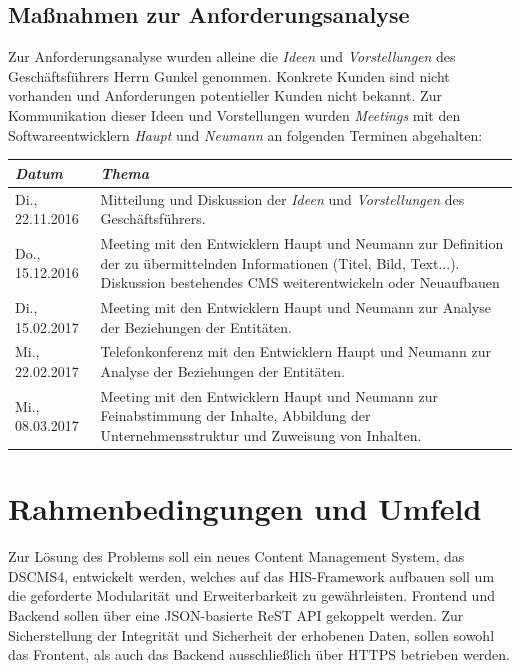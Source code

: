 \documentclass[a4paper]{article}
\begin{document}
	\subsection{Maßnahmen zur Anforderungsanalyse}
	Zur Anforderungsanalyse wurden alleine die \emph{Ideen} und \emph{Vorstellungen} des Geschäftsführers Herrn Gunkel genommen.
	Konkrete Kunden sind nicht vorhanden und Anforderungen potentieller Kunden nicht bekannt.
	Zur Kommunikation dieser Ideen und Vorstellungen wurden \emph{Meetings} mit den Softwareentwicklern \emph{Haupt} und \emph{Neumann} an folgenden Terminen abgehalten:
	\begin{center}
		\begin{tabular}{|p{}|p{}|}
			\hline
			\emph{Datum} & \emph{Thema} \\
			\hline
			Di., 22.11.2016 & Mitteilung und Diskussion der \emph{Ideen} und \emph{Vorstellungen} des Geschäftsführers. \\
			\hline
			Do., 15.12.2016 &Meeting mit den Entwicklern Haupt und Neumann zur Definition der zu übermittelnden Informationen (Titel, Bild, Text...).
       		Diskussion bestehendes CMS weiterentwickeln oder Neuaufbauen
			\\
			\hline
			Di., 15.02.2017 & Meeting mit den Entwicklern Haupt und Neumann zur Analyse der Beziehungen der Entitäten. \\
			\hline
			Mi., 22.02.2017 & Telefonkonferenz mit den Entwicklern Haupt und Neumann zur Analyse der Beziehungen der Entitäten. \\
			\hline
			Mi., 08.03.2017 & Meeting mit den Entwicklern Haupt und Neumann zur Feinabstimmung der Inhalte, Abbildung der Unternehmensstruktur und Zuweisung von Inhalten. \\
			\hline	
		\end{tabular}
	\end{center}
	
	\pagebreak
	\section{Rahmenbedingungen und Umfeld}
	Zur Lösung des Problems soll ein neues Content Management System, das DSCMS4, entwickelt werden, welches auf das HIS-Framework aufbauen soll um die geforderte Modularität und Erweiterbarkeit zu gewährleisten.
	Frontend und Backend sollen über eine JSON-basierte ReST API gekoppelt werden.
	Zur Sicherstellung der Integrität und Sicherheit der erhobenen Daten, sollen sowohl das Frontent, als auch das Backend ausschließlich über HTTPS betrieben werden.
\end{document}
